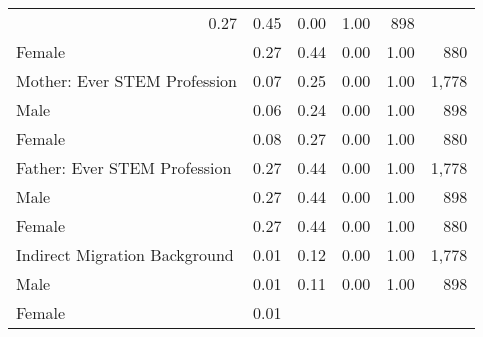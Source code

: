 \documentclass{article}
\begin{document}
\begin{table}[!h]
{\begin{tabular}{llllll}
  \multicolumn{1}{r}{0.27} &
  \multicolumn{1}{r}{0.45} &
  \multicolumn{1}{r}{0.00} &
  \multicolumn{1}{r}{1.00} &
  \multicolumn{1}{r}{898} \\
\multicolumn{1}{l}{\hspace{1em}Female} &
  \multicolumn{1}{r}{0.27} &
  \multicolumn{1}{r}{0.44} &
  \multicolumn{1}{r}{0.00} &
  \multicolumn{1}{r}{1.00} &
  \multicolumn{1}{r}{880} \\
\multicolumn{1}{l}{Mother: Ever STEM Profession} &
  \multicolumn{1}{r}{0.07} &
  \multicolumn{1}{r}{0.25} &
  \multicolumn{1}{r}{0.00} &
  \multicolumn{1}{r}{1.00} &
  \multicolumn{1}{r}{1,778} \\
\multicolumn{1}{l}{\hspace{1em}Male} &
  \multicolumn{1}{r}{0.06} &
  \multicolumn{1}{r}{0.24} &
  \multicolumn{1}{r}{0.00} &
  \multicolumn{1}{r}{1.00} &
  \multicolumn{1}{r}{898} \\
\multicolumn{1}{l}{\hspace{1em}Female} &
  \multicolumn{1}{r}{0.08} &
  \multicolumn{1}{r}{0.27} &
  \multicolumn{1}{r}{0.00} &
  \multicolumn{1}{r}{1.00} &
  \multicolumn{1}{r}{880} \\
\multicolumn{1}{l}{Father: Ever STEM Profession} &
  \multicolumn{1}{r}{0.27} &
  \multicolumn{1}{r}{0.44} &
  \multicolumn{1}{r}{0.00} &
  \multicolumn{1}{r}{1.00} &
  \multicolumn{1}{r}{1,778} \\
\multicolumn{1}{l}{\hspace{1em}Male} &
  \multicolumn{1}{r}{0.27} &
  \multicolumn{1}{r}{0.44} &
  \multicolumn{1}{r}{0.00} &
  \multicolumn{1}{r}{1.00} &
  \multicolumn{1}{r}{898} \\
\multicolumn{1}{l}{\hspace{1em}Female} &
  \multicolumn{1}{r}{0.27} &
  \multicolumn{1}{r}{0.44} &
  \multicolumn{1}{r}{0.00} &
  \multicolumn{1}{r}{1.00} &
  \multicolumn{1}{r}{880} \\
\multicolumn{1}{l}{Indirect Migration Background} &
  \multicolumn{1}{r}{0.01} &
  \multicolumn{1}{r}{0.12} &
  \multicolumn{1}{r}{0.00} &
  \multicolumn{1}{r}{1.00} &
  \multicolumn{1}{r}{1,778} \\
\multicolumn{1}{l}{\hspace{1em}Male} &
  \multicolumn{1}{r}{0.01} &
  \multicolumn{1}{r}{0.11} &
  \multicolumn{1}{r}{0.00} &
  \multicolumn{1}{r}{1.00} &
  \multicolumn{1}{r}{898} \\
\multicolumn{1}{l}{\hspace{1em}Female} &
  \multicolumn{1}{r}{0.01} &

\end{tabular}}
\end{table}
\end{document}
